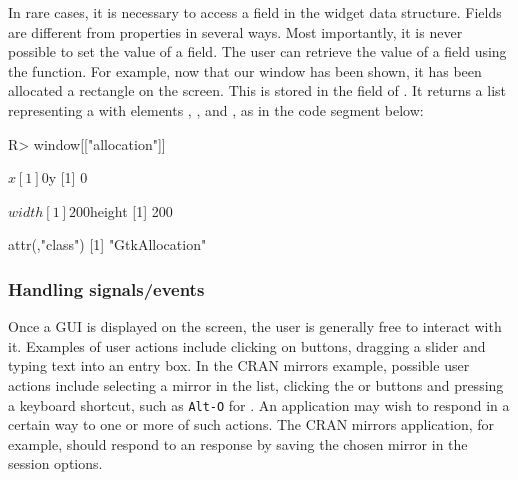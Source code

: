 \documentclass[article,shortnames]{jss}
\begin{document}
In rare cases, it is necessary to access a field in the widget data
structure.
Fields are different from properties in several ways. Most
importantly, it is
never possible to set the value of a field. The user can retrieve the
value of
a field using the \code{[[} function. For example, now that our window
has been shown, it has been allocated a rectangle on the screen. This
is stored
in the  field of . It returns a list 
representing a  with elements , ,
 and , as in the code segment below:

\begin{CodeChunk}
\begin{CodeInput}
R> window[["allocation"]]
\end{CodeInput}
\begin{CodeOutput}
$x
[1] 0

$y
[1] 0

$width
[1] 200

$height
[1] 200

attr(,"class")
[1] "GtkAllocation"
\end{CodeOutput}
\end{CodeChunk}


\subsubsection{Handling signals/events}

Once a GUI is displayed on the screen, the user is generally free to
interact with it. Examples of user actions include clicking on
buttons, dragging a slider and typing text into an entry box.  In the
CRAN mirrors example, possible user actions include selecting a mirror
in the list, clicking the  or  buttons and
pressing a
keyboard shortcut, such as \texttt{Alt-O} for .  An
application
may wish to respond in a certain way to one or more of such actions.
The CRAN mirrors application, for example, should respond to an
response by saving the chosen mirror in the session options.
\end{document}
